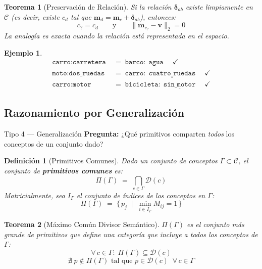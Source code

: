 \documentclass[12pt]{article}
\newtheorem{theorem}{Teorema}[section]
\newtheorem{definition}{Definición}[section]
\newtheorem{example}{Ejemplo}[section]
\begin{document}
\begin{theorem}[Preservación de Relación]
	Si la relación $\bm{\delta}_{ab}$ existe limpiamente en $\mathcal{C}$
	(es decir, existe $c_d$ tal que $\mathbf{m}_d = \mathbf{m}_c + \bm{\delta}_{ab}$),
	entonces:
	\[
	c_? = c_d \qquad \text{y} \qquad
	\bigl\|\mathbf{m}_{c_?} - \mathbf{v}\bigr\|_2 = 0
	\]
	La analogía es exacta cuando la relación está representada en el espacio.
\end{theorem}

\begin{example}
	\begin{align*}
		\texttt{carro} : \texttt{carretera}
		&\;=\; \texttt{barco} : \underline{\;\texttt{agua}\;}
		\quad\checkmark \\[4pt]
		\texttt{moto} : \texttt{dos\_ruedas}
		&\;=\; \texttt{carro} : \underline{\;\texttt{cuatro\_ruedas}\;}
		\quad\checkmark \\[4pt]
		\texttt{carro} : \texttt{motor}
		&\;=\; \texttt{bicicleta} : \underline{\;\texttt{sin\_motor}\;}
		\quad\checkmark
	\end{align*}
\end{example}

\subsection{Razonamiento por Generalización}

\begin{razonbox}{Tipo 4 — Generalización}
	\textbf{Pregunta:} ¿Qué primitivos comparten \emph{todos} los conceptos de un
	conjunto dado?
\end{razonbox}

\begin{definition}[Primitivos Comunes]
	Dado un conjunto de conceptos $\Gamma \subset \mathcal{C}$, el conjunto de
	\textbf{primitivos comunes} es:
	\[
	\Pi(\Gamma) \;=\; \bigcap_{c \in \Gamma} \mathcal{D}(c)
	\]
	Matricialmente, sea $I_\Gamma$ el conjunto de índices de los conceptos en
	$\Gamma$:
	\[
	\Pi(\Gamma) \;=\; \bigl\{\,p_j
	\;\mid\; \min_{i \in I_\Gamma} M_{ij} = 1\,\bigr\}
	\]
\end{definition}

\begin{theorem}[Máximo Común Divisor Semántico]
	$\Pi(\Gamma)$ es el conjunto más grande de primitivos que define una
	categoría que incluye a todos los conceptos de $\Gamma$:
	\[
	\forall\, c \in \Gamma:\; \Pi(\Gamma) \subseteq \mathcal{D}(c)
	\]
	\[
	\nexists\; p \notin \Pi(\Gamma) \text{ tal que }
	p \in \mathcal{D}(c)\;\;\forall\,c \in \Gamma
	\]
\end{theorem}
\end{document}
